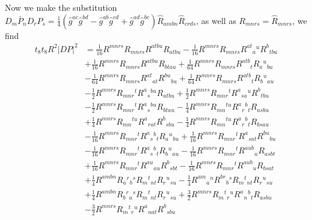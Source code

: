 Now we make the substitution
$D_m\bar{P}_n D_r P_s = \frac{1}{4}(\hat{g}^{ac}\hat{g}^{bd} - \hat{g}^{ab}\hat{g}^{cd}+\hat{g}^{ad}\hat{g}^{bc})\hat{R}_{ambn}\hat{R}_{crds}$, as well as $R_{mnrs} = \hat{R}_{mnrs}$, we find
\begin{equation}
\begin{aligned}
t_8t_8 R^2 |DP|^2
&= \frac{1}{16} R^{m n r s} R_{m n r s} R^{a t b u} R_{a t b u}
- \frac{1}{16} R^{m n r s} R_{m n r s} R^{a t}{}_{a}{}^{u} R^{b}{}_{t b u} \\
& + \frac{1}{16} R^{m n r s} R_{m n r s} R^{a t b u} R_{b t a u}
+ \frac{1}{64} R^{m n r s} R_{m n r s} R^{a t b}{}_{t} R_{a}{}^{u}{}_{b u} \\
& - \frac{1}{64} R^{m n r s} R_{m n r s} R^{a t}{}_{a t} R^{b u}{}_{b u}
+ \frac{1}{64} R^{m n r s} R_{m n r s} R^{a t b}{}_{t} R_{b}{}^{u}{}_{a u} \\
& - \frac{1}{2} R^{m n r s} R_{m n r}{}^{t} R^{a}{}_{s}{}^{b u} R_{a t b u}
+ \frac{1}{2} R^{m n r s} R_{m n r}{}^{t} R^{a}{}_{s a}{}^{u} R^{b}{}_{t b u} \\
& - \frac{1}{2} R^{m n r s} R_{m n r}{}^{t} R^{a}{}_{s}{}^{b u} R_{b t a u}
- \frac{1}{4} R^{m n r s} R_{m n}{}^{t u} R^{a}{}_{r}{}^{b}{}_{t} R_{a s b u} \\
& + \frac{1}{4} R^{m n r s} R_{m n}{}^{t u} R^{a}{}_{r a t} R^{b}{}_{s b u}
- \frac{1}{4} R^{m n r s} R_{m n}{}^{t u} R^{a}{}_{r}{}^{b}{}_{t} R_{b s a u} \\
& - \frac{1}{16} R^{m n r s} R_{m n r}{}^{t} R^{a}{}_{s}{}^{b}{}_{t} R_{a}{}^{u}{}_{b u}
+ \frac{1}{16} R^{m n r s} R_{m n r}{}^{t} R^{a}{}_{s a t} R^{b u}{}_{b u} \\
& - \frac{1}{16} R^{m n r s} R_{m n r}{}^{t} R^{a}{}_{s}{}^{b}{}_{t} R_{b}{}^{u}{}_{a u}
- \frac{1}{16} R^{m n r s} R_{m n r}{}^{t} R^{a u b}{}_{u} R_{a s b t} \\
& + \frac{1}{16} R^{m n r s} R_{m n r}{}^{t} R^{a u}{}_{a u} R^{b}{}_{s b t}
- \frac{1}{16} R^{m n r s} R_{m n r}{}^{t} R^{a u b}{}_{u} R_{b s a t} \\
& + \frac{1}{4} R^{a m b n} R_{a}{}^{r}{}_{b}{}^{s} R_{m}{}^{t}{}_{n t} R_{r}{}^{u}{}_{s u}
- \frac{1}{4} R^{a m}{}_{a}{}^{n} R^{b r}{}_{b}{}^{s} R_{m}{}^{t}{}_{n t} R_{r}{}^{u}{}_{s u} \\
& + \frac{1}{4} R^{a m b n} R_{b}{}^{r}{}_{a}{}^{s} R_{m}{}^{t}{}_{n t} R_{r}{}^{u}{}_{s u}
+ \frac{3}{2} R^{m n r s} R_{m}{}^{t}{}_{r}{}^{u} R^{a}{}_{n}{}^{b}{}_{t} R_{a s b u} \\
& - \frac{3}{2} R^{m n r s} R_{m}{}^{t}{}_{r}{}^{u} R^{a}{}_{n a t} R^{b}{}_{s b u}

\end{aligned}
\end{equation}
